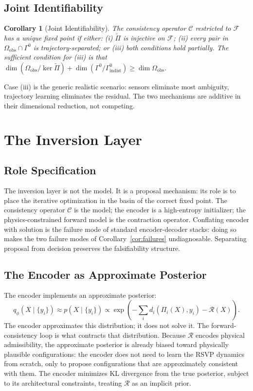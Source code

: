\documentclass[11pt, oneside]{article}
\newtheorem{corollary}[theorem]{Corollary}
\newcommand{\Ftil}{\widetilde{\Pi}}
\begin{document}
\subsection{Joint Identifiability}

\begin{corollary}[Joint Identifiability]
The consistency operator $\mathcal{C}$ restricted to $\mathcal{F}$ has a unique fixed point
if either: (i) $\Ftil$ is injective on $\mathcal{F}$; (ii) every pair in
$\Omega_{\mathrm{obs}} \cap \Gamma^0$ is trajectory-separated; or (iii) both conditions
hold partially. The sufficient condition for (iii) is that $\dim(\Omega_{\mathrm{obs}}/\ker\Ftil)
+ \dim(\Gamma^0/\Gamma^0_{\mathrm{indist}}) \ge \dim\Omega_{\mathrm{obs}}$.
\end{corollary}

Case (iii) is the generic realistic scenario: sensors eliminate most ambiguity, trajectory
learning eliminates the residual. The two mechanisms are additive in their dimensional
reduction, not competing.

\section{The Inversion Layer}
\label{sec:inversion}

\subsection{Role Specification}

The inversion layer is not the model. It is a proposal mechanism: its role is to place
the iterative optimization in the basin of the correct fixed point. The consistency
operator $\mathcal{C}$ is the model; the encoder is a high-entropy initializer; the
physics-constrained forward model is the contraction operator. Conflating encoder with
solution is the failure mode of standard encoder-decoder stacks: doing so makes the two
failure modes of Corollary~\ref{cor:failures} undiagnosable. Separating proposal from
decision preserves the falsifiability structure.

\subsection{The Encoder as Approximate Posterior}

The encoder implements an approximate posterior:
\[
q_\phi(X \mid \{y_i\}) \approx p(X \mid \{y_i\}) \propto
\exp\!\left(-\sum_i d_i(\Pi_i(X), y_i) - \mathcal{R}(X)\right).
\]
The encoder approximates this distribution; it does not solve it. The forward-consistency
loop is what contracts that distribution. Because $\mathcal{R}$ encodes physical
admissibility, the approximate posterior is already biased toward physically plausible
configurations: the encoder does not need to learn the RSVP dynamics from scratch, only
to propose configurations that are approximately consistent with them. The encoder
minimizes KL divergence from the true posterior, subject to its architectural constraints,
treating $\mathcal{R}$ as an implicit prior.
\end{document}

